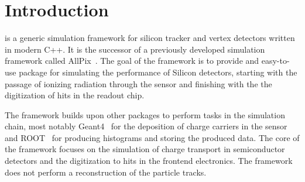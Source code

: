 \section{Introduction}
\label{sec:introduction}
\apsq is a generic simulation framework for silicon tracker and vertex detectors written in modern C++.
It is the successor of a previously developed simulation framework called AllPix~\cite{ap1wiki,ap1git}.
The goal of the \apsq framework is to provide and easy-to-use package for simulating the performance of Silicon detectors, starting with the passage of ionizing radiation through the sensor and finishing with the the digitization of hits in the readout chip.

The framework builds upon other packages to perform tasks in the simulation chain, most notably Geant4~\cite{geant4} for the deposition of charge carriers in the sensor and ROOT~\cite{root} for producing histograms and storing the produced data.
The core of the framework focuses on the simulation of charge transport in semiconductor detectors and the digitization to hits in the frontend electronics.
The framework does not perform a reconstruction of the particle tracks.

